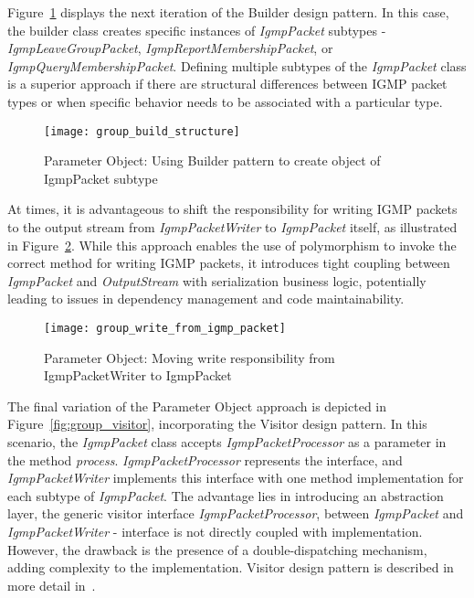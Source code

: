 Figure~\ref{fig:group_build_structure} displays the next iteration of the Builder design pattern.
In this case, the builder class creates specific instances of \textit{IgmpPacket} subtypes -
\textit{IgmpLeaveGroupPacket}, \textit{IgmpReportMembershipPacket}, or \textit{IgmpQueryMembershipPacket}.
Defining multiple subtypes of the \textit{IgmpPacket} class is a superior approach if there are structural differences
between IGMP packet types or when specific behavior needs to be associated with a particular type.

\begin{figure}[!htb]
    \centering
    \texttt{[image: group\_build\_structure]}
    \caption{Parameter Object: Using Builder pattern to create object of IgmpPacket subtype}
    \label{fig:group_build_structure}
\end{figure}

At times, it is advantageous to shift the responsibility for writing IGMP packets to the output stream
from \textit{IgmpPacketWriter} to \textit{IgmpPacket} itself, as illustrated
in Figure~\ref{fig:group_write_from_igmp_packet}.
While this approach enables the use of polymorphism to invoke the correct method for writing IGMP packets,
it introduces tight coupling between \textit{IgmpPacket} and \textit{OutputStream} with serialization business logic,
potentially leading to issues in dependency management and code maintainability.

\begin{figure}[!htb]
    \centering
    \texttt{[image: group\_write\_from\_igmp\_packet]}
    \caption{Parameter Object: Moving write responsibility from IgmpPacketWriter to IgmpPacket}
    \label{fig:group_write_from_igmp_packet}
\end{figure}

The final variation of the Parameter Object approach is depicted in Figure~\ref{fig:group_visitor},
incorporating the Visitor design pattern.
In this scenario, the \textit{IgmpPacket} class accepts \textit{IgmpPacketProcessor} as a parameter
in the method \textit{process}.
\textit{IgmpPacketProcessor} represents the interface, and \textit{IgmpPacketWriter} implements this interface
with one method implementation for each subtype of \textit{IgmpPacket}.
The advantage lies in introducing an abstraction layer, the generic visitor interface \textit{IgmpPacketProcessor},
between \textit{IgmpPacket} and \textit{IgmpPacketWriter} - interface is not directly coupled with implementation.
However, the drawback is the presence of a double-dispatching mechanism, adding complexity to the implementation.
Visitor design pattern is described in more detail in~\cite[Chapter~18]{posa4}.

